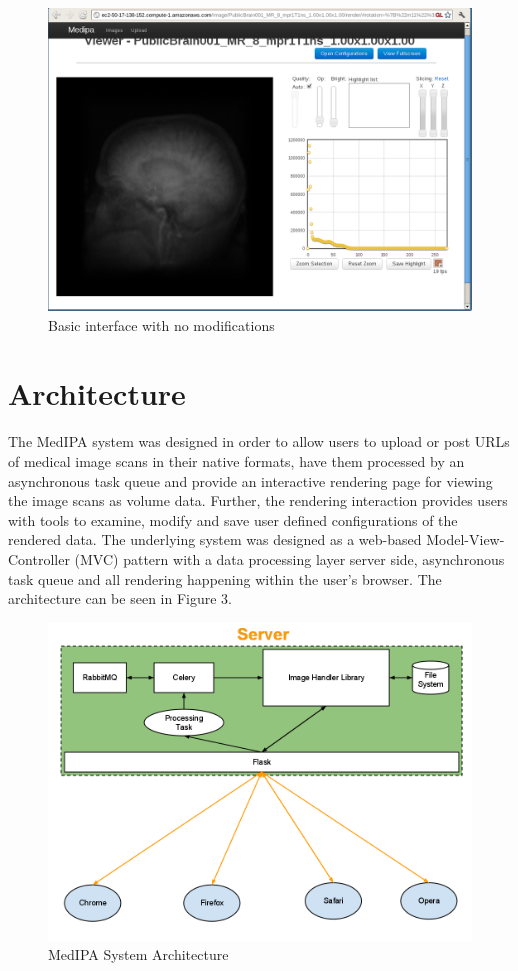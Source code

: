 \documentclass[annual]{acmsiggraph}
\begin{document}
\begin{figure}[htb]
	\includegraphics[scale=0.475]{clean_interface.png}
	\caption{\label{fig:head}Basic interface with no modifications}
\end{figure}

\section{Architecture}
	The MedIPA system was designed in order to allow users to upload or post URLs of medical image scans in their native formats, have them processed by an asynchronous task queue and provide an interactive rendering page for viewing the image scans as volume data.  Further, the rendering interaction provides users with tools to examine, modify and save user defined configurations of the rendered data.  The underlying system was designed as a web-based Model-View-Controller (MVC) pattern with a data processing layer server side, asynchronous task queue and all rendering happening within the user's browser.  The architecture can be seen in Figure 3.

\begin{figure}[htb]
	\includegraphics[scale=0.475]{architecture.png}
	\caption{\label{fig:head}MedIPA System Architecture}
\end{figure}
\end{document}
